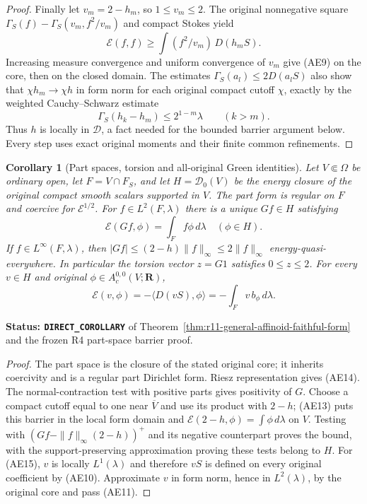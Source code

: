 \documentclass[11pt,a4paper]{article}
\numberwithin{equation}{section}
\newtheorem{corollary}[theorem]{Corollary}
\theoremstyle{definition}
\theoremstyle{remark}
\begin{document}
\begin{proof}
Finally let $v_m=2-h_m$, so $1\leq v_m\leq2$.
The original nonnegative square
$\Gamma_S(f)-\Gamma_S(v_m,f^2/v_m)$ and compact Stokes yield
\[
                  \mathcal E(f,f)\geq
                     \int(f^2/v_m)\,D(h_mS).
\]
Increasing measure convergence and uniform convergence of $v_m$
give (AE9) on the core, then on the closed domain.
The estimates $\Gamma_S(a_l)\leq2D(a_lS)$ also show that
$\chi h_m\to\chi h$ in form norm for each original compact
cutoff $\chi$, exactly by the weighted Cauchy--Schwarz estimate
\[
 \Gamma_S(h_k-h_m)\leq2^{1-m}\lambda\qquad(k>m).
 \tag{AE13}
\]
Thus $h$ is locally in $\mathscr D$, a fact needed for the
bounded barrier argument below.  Every step uses exact original
moments and their finite common refinements.
\end{proof}

\begin{corollary}[Part spaces, torsion and all-original Green identities]
\label{cor:r11-affinoid-part-green}
Let $V\Subset\Omega$ be ordinary open, let $F=V\cap F_S$, and let
$H=\mathscr D_0(V)$ be the energy closure of the original compact
smooth scalars supported in $V$.  The part form is regular on $F$
and coercive for $\mathcal E^{1/2}$.  For $f\in L^2(F,\lambda)$
there is a unique $Gf\in H$ satisfying
\[
                  \mathcal E(Gf,\phi)=\int_F f\phi\,d\lambda
                                   \quad(\phi\in H).
 \tag{AE14}
\]
If $f\in L^\infty(F,\lambda)$, then
$|Gf|\leq(2-h)\|f\|_\infty\leq2\|f\|_\infty$ energy-quasi-everywhere.
In particular the torsion vector $z=G1$ satisfies $0\leq z\leq2$.
For every $v\in H$ and original $\phi\in A_c^{0,0}(V;\mathbf R)$,
\[
       \mathcal E(v,\phi)
             =-\langle D(vS),\phi\rangle
             =-\int_Fv\,b_\phi\,d\lambda.
 \tag{AE15}
\]
\end{corollary}

\noindent\textbf{Status: \texttt{DIRECT\_COROLLARY}} of
Theorem~\ref{thm:r11-general-affinoid-faithful-form} and the frozen
R4 part-space barrier proof.

\begin{proof}
The part space is the closure of the stated original core; it
inherits coercivity and is a regular part Dirichlet form.
Riesz representation gives (AE14).  The normal-contraction test
with positive parts gives positivity of $G$.  Choose a compact
cutoff equal to one near $\overline V$ and use its product with
$2-h$; (AE13) puts this barrier in the local form domain and
$\mathcal E(2-h,\phi)=\int\phi\,d\lambda$ on $V$.
Testing with $(Gf-\|f\|_\infty(2-h))^+$ and its negative
counterpart proves the bound, with the support-preserving
approximation proving these tests belong to $H$.
For (AE15), $v$ is locally $L^1(\lambda)$ and therefore $vS$
is defined on every original coefficient by (AE10).
Approximate $v$ in form norm, hence in $L^2(\lambda)$, by
the original core and pass (AE11).
\end{proof}
\end{document}
